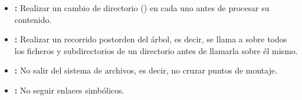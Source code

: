 \begin{itemize}
	\item{}\textbf{:} Realizar un cambio de directorio () en cada uno antes de procesar su contenido.
	\item{}\textbf{:} Realizar un recorrido postorden del árbol, es decir, se llama a  sobre todos los ficheros y subdirectorios de un directorio antes de llamarla sobre él mismo.
	\item{}\textbf{:} No salir del sistema de archivos, es decir, no cruzar puntos de montaje.
	\item{}\textbf{:} No seguir enlaces simbólicos.
\end{itemize}

\begin{lstlisting}[language=C]
\end{lstlisting}
\begin{lstlisting}[language=C]
\end{lstlisting}
\begin{lstlisting}[language=C]
\end{lstlisting}
